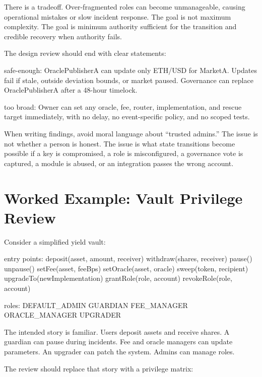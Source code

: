 There is a tradeoff. Over-fragmented roles can become unmanageable, causing operational mistakes or slow incident response. The goal is not maximum complexity. The goal is minimum authority sufficient for the transition and credible recovery when authority fails.

The design review should end with clear statements:

\begin{codeblock}
safe-enough:
    OraclePublisherA can update only ETH/USD for MarketA.
    Updates fail if stale, outside deviation bounds, or market paused.
    Governance can replace OraclePublisherA after a 48-hour timelock.

too broad:
    Owner can set any oracle, fee, router, implementation, and rescue target
    immediately, with no delay, no event-specific policy, and no scoped tests.
\end{codeblock}

When writing findings, avoid moral language about ``trusted admins.'' The issue is not whether a person is honest. The issue is what state transitions become possible if a key is compromised, a role is misconfigured, a governance vote is captured, a module is abused, or an integration passes the wrong account.

\section{Worked Example: Vault Privilege Review}

Consider a simplified yield vault:

\begin{codeblock}
entry points:
    deposit(asset, amount, receiver)
    withdraw(shares, receiver)
    pause()
    unpause()
    setFee(asset, feeBps)
    setOracle(asset, oracle)
    sweep(token, recipient)
    upgradeTo(newImplementation)
    grantRole(role, account)
    revokeRole(role, account)

roles:
    DEFAULT_ADMIN
    GUARDIAN
    FEE_MANAGER
    ORACLE_MANAGER
    UPGRADER
\end{codeblock}

The intended story is familiar. Users deposit assets and receive shares. A guardian can pause during incidents. Fee and oracle managers can update parameters. An upgrader can patch the system. Admins can manage roles.

The review should replace that story with a privilege matrix:


